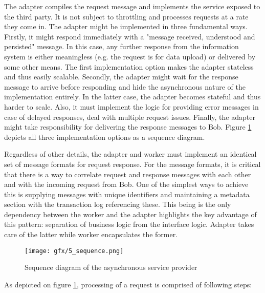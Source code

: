 \documentclass[10pt,a4paper]{article}
\begin{document}
The adapter compiles the request message and implements the service exposed to the third party. It is not subject to throttling and processes requests at a rate they come in. The adapter might be implemented in three fundamental ways. Firstly, it might respond immediately with a "message received, understood and persisted" message. In this case, any further response from the information system is either meaningless (e.g. the request is for data upload) or delivered by some other means. The first implementation option makes the adapter  stateless and thus easily scalable. Secondly, the adapter might wait for the response message to arrive before responding and hide the asynchronous nature of the implementation entirely. In the latter case, the adapter becomes stateful and thus harder to scale. Also, it must implement the logic for providing error messages in case of delayed responses, deal with multiple request issues. Finally, the adapter might take responsibility for delivering the response messages to Bob. Figure \ref{fig:p:5:async} depicts all three implementation options as a sequence diagram.

Regardless of other details, the adapter and worker must implement an identical set of message formats for request response. For the message formats, it is critical that there is a way to correlate request and response messages with each other and with the incoming request from Bob. One of the simplest ways to achieve this is supplying messages with unique identifiers and maintaining a metadata section with the transaction log referencing these. This being is the only dependency between the worker and the adapter highlights the key advantage of this pattern: separation of business logic from the interface logic. Adapter takes care of the latter while worker encapsulates the former.

\begin{figure}[htp]
	\begin{center}
		\texttt{[image: gfx/5\_sequence.png]}
		\caption{Sequence diagram of the asynchronous service provider}
		\label{fig:p:5:async}
	\end{center}
\end{figure}

As depicted on figure \ref{fig:p:5:async}, processing of a request is comprised of following steps:
\end{document}
